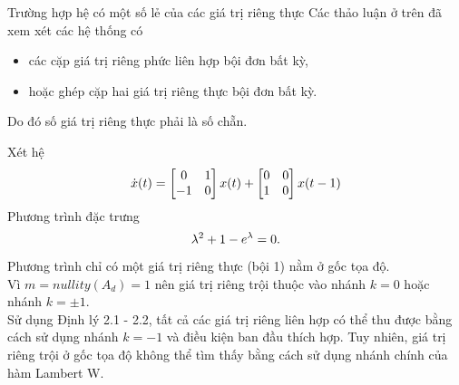 \documentclass[10pt]{beamer}
\begin{document}
	\small{
	\begin{frame}{Trường hợp hệ có một số lẻ của các giá trị riêng thực}
		Các thảo luận ở trên đã xem xét các hệ thống có
		\begin{itemize}
			\item các cặp giá trị riêng phức liên hợp bội đơn bất kỳ,
			\item hoặc ghép cặp hai giá trị riêng thực bội đơn bất kỳ.
		\end{itemize}  
		{\color{red} Do đó số giá trị riêng thực phải là số chẵn.} 
		
	      Xét hệ
			\begin{equation*}\label{eq43}
				\dot{x}(t) = \begin{bmatrix} 0 & 1\\ - 1 & 0 \end{bmatrix}x(t) + \begin{bmatrix} 0 & 0 \\ 1 & 0 \end{bmatrix}x(t - 1)
			\end{equation*}
			Phương trình đặc trưng
			\begin{equation*}\label{eq44}
				\lambda^2 + 1 - e^{\lambda} = 0.
			\end{equation*}
			Phương trình chỉ có một giá trị riêng thực (bội 1) nằm ở gốc tọa độ.\\
			Vì $m=nullity(A_d) = 1$ nên giá trị riêng trội thuộc vào nhánh $k=0$ hoặc nhánh $k = \pm1$.\\	
			Sử dụng Định lý 2.1 - 2.2, tất cả các giá trị riêng liên hợp có thể thu được bằng cách sử dụng nhánh $k = -1$ và điều kiện ban đầu thích hợp. {\color{magenta}Tuy nhiên, giá trị riêng trội ở gốc tọa độ không thể tìm thấy bằng cách sử dụng nhánh chính của hàm Lambert W.}			
	\end{frame}
}
	
\end{document}
